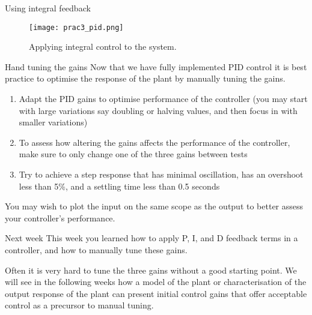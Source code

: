 \documentclass[9pt]{beamer-control}
\begin{document}
\begin{frame}{Using integral feedback}
			\begin{figure}
		\centering
		\texttt{[image: prac3\_pid.png]}
		\caption{Applying integral control to the system.}
	\end{figure}
\end{frame}


\begin{frame}{Hand tuning the gains}
Now that we have fully implemented PID control it is best practice to optimise the response of the plant by manually tuning the gains. 

\begin{enumerate}
	\item Adapt the PID gains to optimise performance of the controller (you may start with large variations say doubling or halving values, and then focus in with smaller variations)
	\item To assess how altering the gains affects the performance of the controller, make sure to only change one of the three gains between tests
	\item Try to achieve a step response that has minimal oscillation, has an overshoot less than 5\%, and a settling time less than 0.5 seconds
\end{enumerate}
You may wish to plot the input on the same scope as the output to better assess your controller's performance.

\end{frame}

\begin{frame}{Next week}
This week you learned how to apply P, I, and D feedback terms in a controller, and how to manually tune these gains.

Often it is very hard to tune the three gains without a good starting point. We will see in the following weeks how a model of the plant or characterisation of the output response of the plant can present initial control gains that offer acceptable control as a precursor to manual tuning. 
\end{frame}
\end{document}
